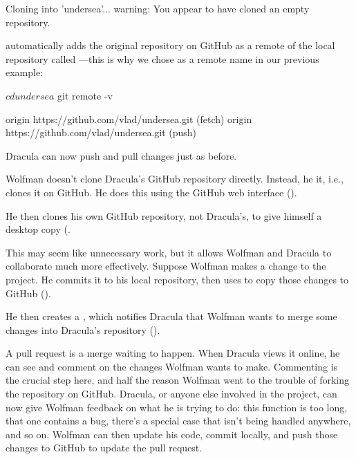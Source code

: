 \begin{VerbOut}
Cloning into 'undersea'...
warning: You appear to have cloned an empty repository.
\end{VerbOut}

 automatically adds the original repository on GitHub
as a remote of the local repository called ---this is why
we chose  as a remote name in our previous example:

\begin{VerbIn}
$ cd undersea
$ git remote -v
\end{VerbIn}

\begin{VerbOut}
origin https://github.com/vlad/undersea.git (fetch)
origin https://github.com/vlad/undersea.git (push)
\end{VerbOut}

Dracula can now push and pull changes just as before.

Wolfman doesn't clone Dracula's GitHub repository directly. Instead, he
 it, i.e., clones it on GitHub. He
does this using the GitHub web interface ().


He then clones his own GitHub repository, not Dracula's, to give himself
a desktop copy (.

This may seem like unnecessary work, but it allows Wolfman and Dracula
to collaborate much more effectively. Suppose Wolfman makes a change to
the project. He commits it to his local repository, then uses
 to copy those changes to GitHub ().



He then creates a , which
notifies Dracula that Wolfman wants to merge some changes into Dracula's
repository ().


A pull request is a merge waiting to happen. When Dracula views it
online, he can see and comment on the changes Wolfman wants to make.
Commenting is the crucial step here, and half the reason Wolfman went to
the trouble of forking the repository on GitHub. Dracula, or anyone else
involved in the project, can now give Wolfman feedback on what he is
trying to do: this function is too long, that one contains a bug,
there's a special case that isn't being handled anywhere, and so on.
Wolfman can then update his code, commit locally, and push those changes
to GitHub to update the pull request.

